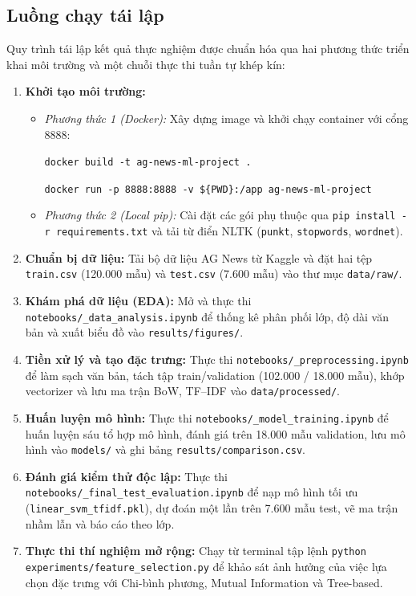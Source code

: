 \documentclass[12pt]{hcmut-report}
\newcommand{\firstparagraph}{\noindent\hspace*{2em}}
\begin{document}
\subsection{Luồng chạy tái lập}

\firstparagraph Quy trình tái lập kết quả thực nghiệm được chuẩn hóa qua hai phương thức triển khai môi trường và một chuỗi thực thi tuần tự khép kín:

\begin{enumerate}[leftmargin=2em,itemsep=2.5pt]
  \item \textbf{Khởi tạo môi trường:} 
  \begin{itemize}[leftmargin=1.5em,itemsep=1pt]
    \item \textit{Phương thức 1 (Docker):} Xây dựng image và khởi chạy container với cổng 8888:
    \par\vspace{2pt}
    \texttt{docker build -t ag-news-ml-project .}
    \par\vspace{2pt}
    \texttt{docker run -p 8888:8888 -v \$\{PWD\}:/app\allowbreak{} ag-news-ml-project}
    \item \textit{Phương thức 2 (Local pip):} Cài đặt các gói phụ thuộc qua \texttt{pip install -r requirements.txt} và tải từ điển NLTK (\texttt{punkt}, \texttt{stopwords}, \texttt{wordnet}).
  \end{itemize}
  \item \textbf{Chuẩn bị dữ liệu:} Tải bộ dữ liệu AG News từ Kaggle và đặt hai tệp \texttt{train.csv} (120.000 mẫu) và \texttt{test.csv} (7.600 mẫu) vào thư mục \texttt{data/raw/}.
  \item \textbf{Khám phá dữ liệu (EDA):} Mở và thực thi \texttt{notebooks/\_data\_analysis.ipynb} để thống kê phân phối lớp, độ dài văn bản và xuất biểu đồ vào \texttt{results/\allowbreak figures/}.
  \item \textbf{Tiền xử lý và tạo đặc trưng:} Thực thi \texttt{notebooks/\_preprocessing.ipynb} để làm sạch văn bản, tách tập train/validation (102.000 / 18.000 mẫu), khớp vectorizer và lưu ma trận BoW, TF--IDF vào \texttt{data/\allowbreak processed/}.
  \item \textbf{Huấn luyện mô hình:} Thực thi \texttt{notebooks/\_model\_training.ipynb} để huấn luyện sáu tổ hợp mô hình, đánh giá trên 18.000 mẫu validation, lưu mô hình vào \texttt{models/} và ghi bảng \texttt{results/\allowbreak comparison.csv}.
  \item \textbf{Đánh giá kiểm thử độc lập:} Thực thi \texttt{notebooks/\_final\_\allowbreak test\_\allowbreak evaluation\allowbreak .ipynb} để nạp mô hình tối ưu (\texttt{linear\_svm\_tfidf.pkl}), dự đoán một lần trên 7.600 mẫu test, vẽ ma trận nhầm lẫn và báo cáo theo lớp.
  \item \textbf{Thực thi thí nghiệm mở rộng:} Chạy từ terminal tập lệnh \texttt{python experiments/\allowbreak feature\_selection.py} để khảo sát ảnh hưởng của việc lựa chọn đặc trưng với Chi-bình phương, Mutual Information và Tree-based.
\end{enumerate}
\end{document}
